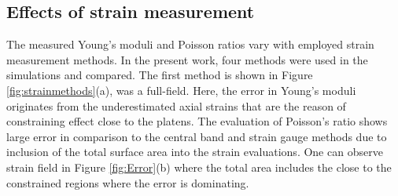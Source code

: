 \documentclass[3p]{elsarticle}
\begin{document}
\subsection{Effects of strain measurement}
The measured Young’s moduli and Poisson ratios vary with employed strain measurement methods. In the
present work, four methods were used in the simulations and compared. The
first method is shown in Figure \ref{fig:strainmethods}(a), was a full-field.
Here, the error in Young’s moduli originates from the underestimated axial strains that are the
reason of constraining effect close to the platens. The evaluation of
Poisson's ratio shows large error in comparison to the central band and strain
gauge methods  due to inclusion of the total surface area into the strain
evaluations. One can observe strain field in Figure \ref{fig:Error}(b) where the total area includes the close to the constrained regions where the error is dominating.
\end{document}
